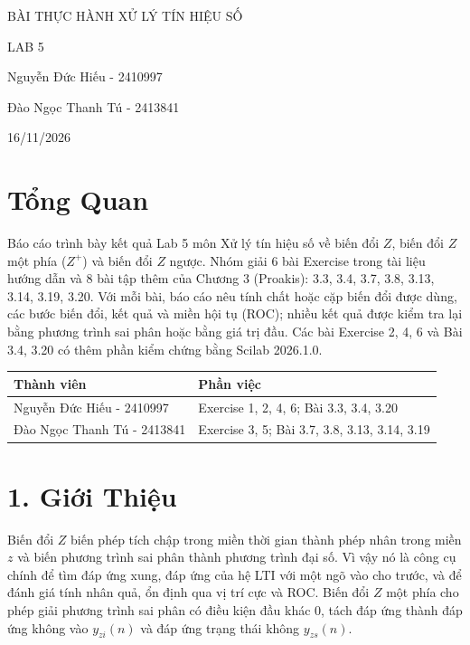 \documentclass[12pt,a4paper]{article}
\newcommand{\nguoiA}{Nguyễn Đức Hiếu - 2410997}
\newcommand{\nguoiB}{Đào Ngọc Thanh Tú - 2413841}
\newcommand{\ngaynop}{16/11/2026}
\begin{document}
\begin{center}
\vspace*{3.5cm}
{\LARGE BÀI THỰC HÀNH XỬ LÝ TÍN HIỆU SỐ\par}
\vspace{1.2cm}
{\LARGE LAB 5\par}
\vspace{1.2cm}
{\large \nguoiA\par}
{\large \nguoiB\par}
{\large \ngaynop\par}
\end{center}
\newpage

\section*{Tổng Quan}
Báo cáo trình bày kết quả Lab 5 môn Xử lý tín hiệu số về biến đổi $Z$, biến đổi $Z$ một phía ($Z^{+}$) và biến đổi $Z$ ngược. Nhóm giải 6 bài Exercise trong tài liệu hướng dẫn và 8 bài tập thêm của Chương 3 (Proakis): 3.3, 3.4, 3.7, 3.8, 3.13, 3.14, 3.19, 3.20. Với mỗi bài, báo cáo nêu tính chất hoặc cặp biến đổi được dùng, các bước biến đổi, kết quả và miền hội tụ (ROC); nhiều kết quả được kiểm tra lại bằng phương trình sai phân hoặc bằng giá trị đầu. Các bài Exercise 2, 4, 6 và Bài 3.4, 3.20 có thêm phần kiểm chứng bằng Scilab 2026.1.0.

\begin{table}[H]
\centering
\begin{tabular}{|l|l|}
\hline
\textbf{Thành viên} & \textbf{Phần việc} \\ \hline
\nguoiA & Exercise 1, 2, 4, 6; Bài 3.3, 3.4, 3.20 \\ \hline
\nguoiB & Exercise 3, 5; Bài 3.7, 3.8, 3.13, 3.14, 3.19 \\ \hline
\end{tabular}
\end{table}

\section*{1. Giới Thiệu}
Biến đổi $Z$ biến phép tích chập trong miền thời gian thành phép nhân trong miền $z$ và biến phương trình sai phân thành phương trình đại số. Vì vậy nó là công cụ chính để tìm đáp ứng xung, đáp ứng của hệ LTI với một ngõ vào cho trước, và để đánh giá tính nhân quả, ổn định qua vị trí cực và ROC. Biến đổi $Z$ một phía cho phép giải phương trình sai phân có điều kiện đầu khác 0, tách đáp ứng thành đáp ứng không vào $y_{zi}(n)$ và đáp ứng trạng thái không $y_{zs}(n)$.
\end{document}
